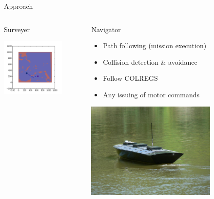 \documentclass[9pt]{beamer}
\begin{document}
\begin{frame}{Approach}
\begin{columns}
\begin{column}{0.33\textwidth}
\begin{block}{Surveyer}
\begin{center}
\begin{itemize}
                    \end{itemize}
                    \includegraphics[width=0.75\textwidth,trim={4cm 2cm 4cm 6cm},clip]{img/samplepath.png}
                \end{center}
            \end{block}
        \end{column}
        \begin{column}{0.33\textwidth}
            \begin{block}{Navigator}
                \begin{itemize}
	                \item Path following (mission execution)
    	            \item Collision detection \& avoidance
                    \item Follow COLREGS
	                \item Any issuing of motor commands
                \end{itemize}
                \includegraphics[width=0.75\textwidth,trim={1cm 1cm 1cm 1cm},clip]{img/usv.jpeg}
            \end{block}
        \end{column}
    \end{columns}
\end{frame}  
\end{document}
